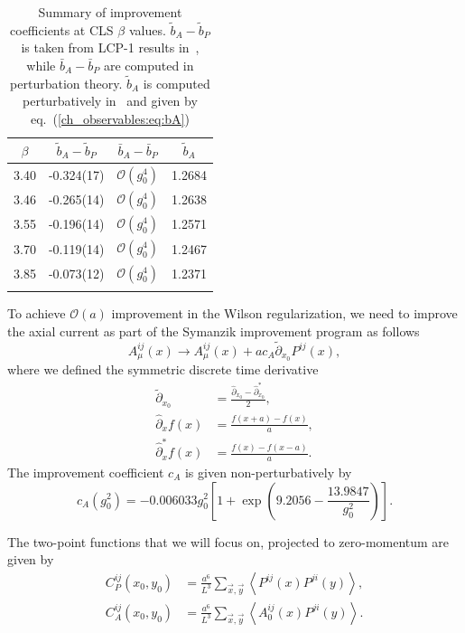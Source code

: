 \begin{longtable}{c c c c}
    \label{ch_observables:tab:b}
    $\beta$ & $\tilde{b}_A-\tilde{b}_P$ & $\bar{b}_A-\bar{b}_P$ & $\tilde{b}_A$ \\
    \toprule
    3.40 & -0.324(17) & $\mathcal{O}(g_0^4)$ & 1.2684 \\
    3.46 & -0.265(14) & $\mathcal{O}(g_0^4)$ & 1.2638 \\
    3.55 & -0.196(14) & $\mathcal{O}(g_0^4)$ & 1.2571 \\
    3.70 & -0.119(14) & $\mathcal{O}(g_0^4)$ & 1.2467 \\
    3.85 & -0.073(12) & $\mathcal{O}(g_0^4)$ & 1.2371 \\
    \bottomrule
    \caption{Summary of improvement coefficients at CLS $\beta$ values. $\tilde{b}_A-\tilde{b}_P$ is taken from LCP-1 results in~\citep{deDivitiis:2017vvw}, while $\bar{b}_A-\bar{b}_P$ are computed in perturbation theory. $\tilde{b}_A$ is computed perturbatively in~\citep{Taniguchi:1998pf} and given by eq.~(\ref{ch_observables:eq:bA})}
\end{longtable}

To achieve $\mathcal{O}(a)$ improvement in the Wilson regularization, we need to improve the axial current as part of the Symanzik improvement program as follows
\begin{equation}
\label{ch_observables:eq:axial_impr}
A_{\mu}^{ij}(x)\rightarrow A_{\mu}^{ij}(x)+ac_A\tilde{\partial}_{x_0}P^{ij}(x),
\end{equation}
where we defined the symmetric discrete time derivative
\begin{align}
\tilde{\partial}_{x_0}&=\frac{\hat{\partial}_{x_0}-\hat{\partial}_{x_0}^*}{2},\\
\hat{\partial}_{x}f(x)&=\frac{f(x+a)-f(x)}{a},\\
\hat{\partial}^*_{x}f(x)&=\frac{f(x)-f(x-a)}{a}.
\end{align}
The improvement coefficient $c_A$ is given non-perturbatively by~\citep{Bulava:2015bxa}
\begin{equation}
c_A(g_0^2)=-0.006033g_0^2\left[1+\exp\left(9.2056-\frac{13.9847}{g_0^2}\right)\right].
\end{equation}

The two-point functions that we will focus on, projected to zero-momentum are given by
\begin{align}
\label{ch_observables:eq:corrs}
C_P^{ij}(x_0,y_0)&=\frac{a^6}{L^3}\sum_{\vec{x},\vec{y}}\left<P^{ij}(x)P^{ji}(y)\right>,\\
C_A^{ij}(x_0,y_0)&=\frac{a^6}{L^3}\sum_{\vec{x},\vec{y}}\left<A_0^{ij}(x)P^{ji}(y)\right>.
\end{align}

